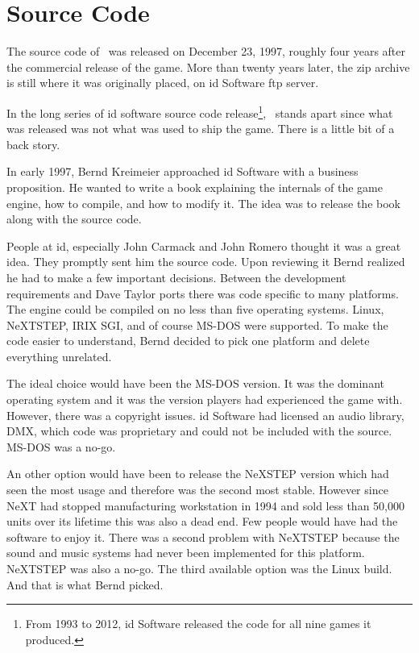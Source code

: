 \section{Source Code}
The source code of \doom~was released on December 23, 1997, roughly four years after the commercial release of the game. More than twenty years later, the zip archive is still where it was originally placed, on id Software ftp server.\\
\par
{}
\par
 In the long series of id software source code release\footnote{From 1993 to 2012, id Software released the code for all nine games it produced.}, \doom~stands apart since what was released was not what was used to ship the game. There is a little bit of a back story.\\
 \par
 In early 1997, Bernd Kreimeier approached id Software with a business proposition. He wanted to write a book explaining the internals of the game engine, how to compile, and how to modify it. The idea was to release the book along with the source code.\\
 \par
  People at id, especially John Carmack and John Romero thought it was a great idea. They promptly sent him the source code. Upon reviewing it Bernd realized he had to make a few important decisions. Between the development requirements and Dave Taylor ports there was code specific to many platforms. The engine could be compiled on no less than five operating systems. Linux, NeXTSTEP, IRIX SGI, and of course MS-DOS were supported. To make the code easier to understand, Bernd decided to pick one platform and delete everything unrelated.\\
  \par
  The ideal choice would have been the MS-DOS version. It was the dominant operating system and it was the version players had experienced the game with. However, there was a copyright issues. id Software had licensed an audio library, DMX, which code was proprietary and could not be included with the source. MS-DOS was a no-go.\\
  \par
   An other option would have been to release the NeXSTEP version which had seen the most usage and therefore was the second most stable. However since NeXT had stopped manufacturing workstation in 1994 and sold less than 50,000 units over its lifetime this was also a dead end. Few people would have had the software to enjoy it. There was a second problem with NeXTSTEP because the sound and music systems had never been implemented for this platform. NeXTSTEP was also a no-go. The third available option was the Linux build. And that is what Bernd picked.\\
